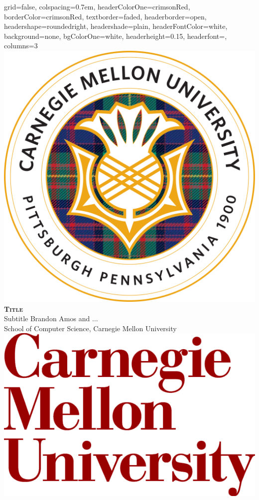 \documentclass[landscape,archE,fontscale=0.2]{baposter}
\begin{document}
\begin{poster}{
    grid=false,
    colspacing=0.7em,
    headerColorOne=crimsonRed, borderColor=crimsonRed,
    textborder=faded,
    headerborder=open, headershape=roundedright,
    headershade=plain, headerFontColor=white,
    background=none, bgColorOne=white,
    headerheight=0.15\textheight,
    headerfont=\color{white}\textsf\textbf\Large,
    columns=3
  }{
    \includegraphics[height=0.13\textheight]{cmu-seal}
  }{
    {\textsc{\textbf{\LARGE Title}}} \\
    {\Large Subtitle}
  }{\vspace{2mm}\large
    Brandon Amos and $\ldots$ \\
    School of Computer Science,
    Carnegie Mellon University
  }{
    \includegraphics[height=0.11\textheight]{cmu-logo}
  }


\end{poster}
\end{document}
